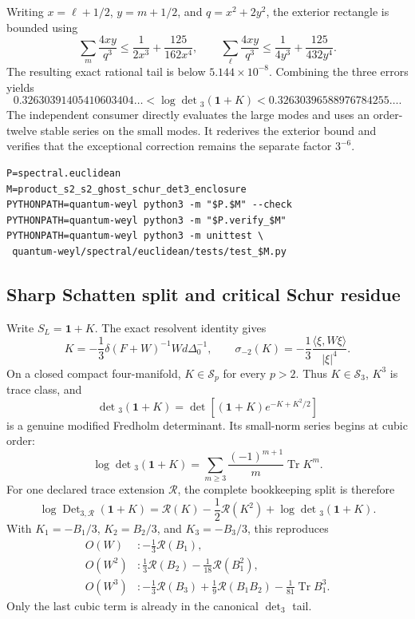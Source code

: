 \documentclass[11pt]{article}
\theoremstyle{definition}
\theoremstyle{remark}
\begin{document}
Writing $x=\ell+1/2$, $y=m+1/2$, and $q=x^2+2y^2$, the exterior rectangle is
bounded using
\[
 \sum_m\frac{4xy}{q^3}\leq\frac1{2x^3}+\frac{125}{162x^4},
 \qquad
 \sum_\ell\frac{4xy}{q^3}\leq\frac1{4y^3}+\frac{125}{432y^4}.
\]
The resulting exact rational tail is below $5.144\times10^{-8}$.  Combining
the three errors yields
\[
 0.32630391405410603404\ldots
 <\log\det{}_3(\mathbf1+K)<
 0.32630396588976784255\ldots .
\]
The independent consumer directly evaluates the large modes and uses an
order-twelve stable series on the small modes.  It rederives the exterior
bound and verifies that the exceptional correction remains the separate
factor $3^{-6}$.

\begin{verbatim}
P=spectral.euclidean
M=product_s2_s2_ghost_schur_det3_enclosure
PYTHONPATH=quantum-weyl python3 -m "$P.$M" --check
PYTHONPATH=quantum-weyl python3 -m "$P.verify_$M"
PYTHONPATH=quantum-weyl python3 -m unittest \
 quantum-weyl/spectral/euclidean/tests/test_$M.py
\end{verbatim}

\subsection{Sharp Schatten split and critical Schur residue}

Write $S_L=\mathbf1+K$.  The exact resolvent identity gives
\[
 K=-\frac13\delta(F+W)^{-1}Wd\Delta_0^{-1},
 \qquad
 \sigma_{-2}(K)=-\frac13\frac{\langle\xi,W\xi\rangle}{|\xi|^4}.
\]
On a closed compact four-manifold, $K\in\mathcal S_p$ for every $p>2$.
Thus $K\in\mathcal S_3$, $K^3$ is trace class, and
\[
 \det{}_3(\mathbf1+K)
 =\det\!\left[(\mathbf1+K)e^{-K+K^2/2}\right]
\]
is a genuine modified Fredholm determinant.  Its small-norm series begins at
cubic order:
\[
 \log\det{}_3(\mathbf1+K)
 =\sum_{m\geq3}\frac{(-1)^{m+1}}m\operatorname{Tr}K^m.
\]
For one declared trace extension $\mathcal R$, the complete bookkeeping split
is therefore
\[
 \log\operatorname{Det}_{3,\mathcal R}(\mathbf1+K)
 =\mathcal R(K)-\frac12\mathcal R(K^2)+\log\det{}_3(\mathbf1+K).
\]
With $K_1=-B_1/3$, $K_2=B_2/3$, and $K_3=-B_3/3$, this reproduces
\begin{align*}
O(W)&:-\tfrac13\mathcal R(B_1),\\
O(W^2)&:\tfrac13\mathcal R(B_2)-\tfrac1{18}\mathcal R(B_1^2),\\
O(W^3)&:-\tfrac13\mathcal R(B_3)+\tfrac19\mathcal R(B_1B_2)
        -\tfrac1{81}\operatorname{Tr}B_1^3.
\end{align*}
Only the last cubic term is already in the canonical $\det_3$ tail.
\end{document}
